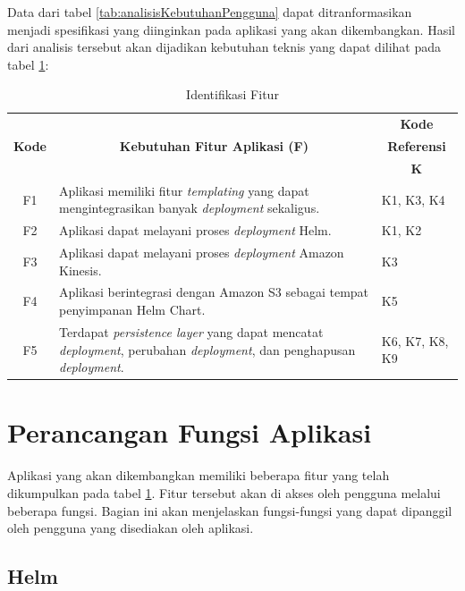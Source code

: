 Data dari tabel \ref{tab:analisisKebutuhanPengguna} dapat ditranformasikan menjadi spesifikasi yang diinginkan pada aplikasi yang akan dikembangkan. Hasil dari analisis tersebut akan dijadikan kebutuhan teknis yang dapat dilihat pada tabel \ref{tab:analisisFitur}:
\begin{table}
    \centering
    \begin{tabular}{|c|p{11cm}|p{1.5cm}|}
        \hline
         &  & \multicolumn{1}{|c|}{\textbf{Kode}} \\
        \multicolumn{1}{|c|}{\textbf{Kode}} &  \multicolumn{1}{c|}{\textbf{Kebutuhan Fitur Aplikasi (F)}} & \multicolumn{1}{|c|}{\textbf{Referensi}}\\
        & & \multicolumn{1}{|c|}{\textbf{K}} \\
        \hline
        F1 & Aplikasi memiliki fitur \textit{templating} yang dapat mengintegrasikan banyak \textit{deployment} sekaligus. & K1, K3, K4\\
        \hline
        F2 & Aplikasi dapat melayani proses \textit{deployment} Helm. & K1, K2\\
        \hline
        F3 & Aplikasi dapat melayani proses \textit{deployment} Amazon Kinesis. & K3\\
        \hline
        F4 & Aplikasi berintegrasi dengan Amazon S3 sebagai tempat penyimpanan Helm Chart. & K5\\
        \hline
        F5 & Terdapat \textit{persistence layer} yang dapat mencatat \textit{deployment}, perubahan \textit{deployment}, dan penghapusan \textit{deployment}. & K6, K7, K8, K9\\
        \hline        
    \end{tabular}
    \caption{Identifikasi Fitur}
    \label{tab:analisisFitur}
\end{table}

\section{Perancangan Fungsi Aplikasi}
\label{sec:penggunaanAplikasi}

Aplikasi yang akan dikembangkan memiliki beberapa fitur yang telah dikumpulkan pada tabel \ref{tab:analisisFitur}. Fitur tersebut akan di akses oleh pengguna melalui beberapa fungsi. Bagian ini akan menjelaskan fungsi-fungsi yang dapat dipanggil oleh pengguna yang disediakan oleh aplikasi.

\subsection{Helm}
\label{sec:helmFeature}

